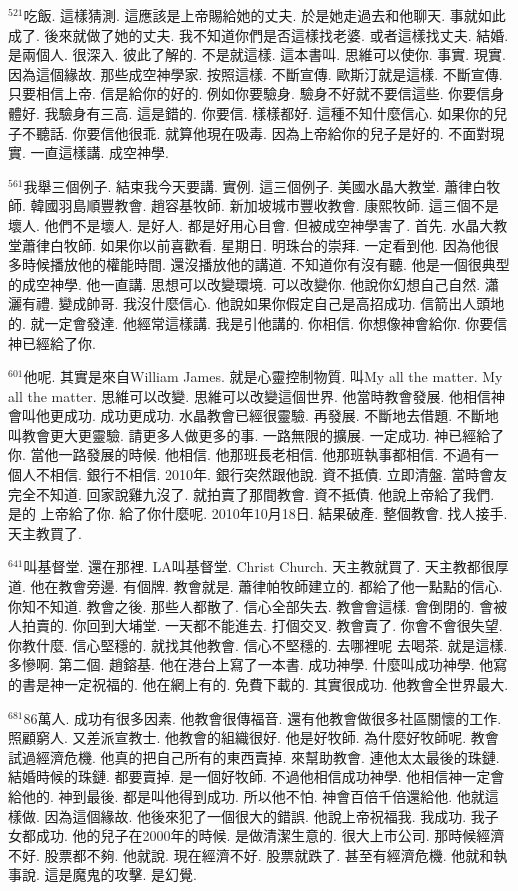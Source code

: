 \documentclass{book}
\begin{document}
$^{521}$吃飯.
這樣猜測.
這應該是上帝賜給她的丈夫.
於是她走過去和他聊天.
事就如此成了.
後來就做了她的丈夫.
我不知道你們是否這樣找老婆.
或者這樣找丈夫.
結婚.
是兩個人.
很深入.
彼此了解的.
不是就這樣.
這本書叫.
思維可以使你.
事實.
現實.
因為這個緣故.
那些成空神學家.
按照這樣.
不斷宣傳.
歐斯汀就是這樣.
不斷宣傳.
只要相信上帝.
信是給你的好的.
例如你要驗身.
驗身不好就不要信這些.
你要信身體好.
我驗身有三高.
這是錯的.
你要信.
樣樣都好.
這種不知什麼信心.
如果你的兒子不聽話.
你要信他很乖.
就算他現在吸毒.
因為上帝給你的兒子是好的.
不面對現實.
一直這樣講.
成空神學.

$^{561}$我舉三個例子.
結束我今天要講.
實例.
這三個例子.
美國水晶大教堂.
蕭律白牧師.
韓國羽島順豐教會.
趙容基牧師.
新加坡城市豐收教會.
康熙牧師.
這三個不是壞人.
他們不是壞人.
是好人.
都是好用心目會.
但被成空神學害了.
首先.
水晶大教堂蕭律白牧師.
如果你以前喜歡看.
星期日.
明珠台的崇拜.
一定看到他.
因為他很多時候播放他的權能時間.
還沒播放他的講道.
不知道你有沒有聽.
他是一個很典型的成空神學.
他一直講.
思想可以改變環境.
可以改變你.
他說你幻想自己自然.
瀟灑有禮.
變成帥哥.
我沒什麼信心.
他說如果你假定自己是高招成功.
信箭出人頭地的.
就一定會發達.
他經常這樣講.
我是引他講的.
你相信.
你想像神會給你.
你要信神已經給了你.

$^{601}$他呢.
其實是來自William James.
就是心靈控制物質.
叫My all the matter.
My all the matter.
思維可以改變.
思維可以改變這個世界.
他當時教會發展.
他相信神會叫他更成功.
成功更成功.
水晶教會已經很靈驗.
再發展.
不斷地去借題.
不斷地叫教會更大更靈驗.
請更多人做更多的事.
一路無限的擴展.
一定成功.
神已經給了你.
當他一路發展的時候.
他相信.
他那班長老相信.
他那班執事都相信.
不過有一個人不相信.
銀行不相信.
2010年.
銀行突然跟他說.
資不抵債.
立即清盤.
當時會友完全不知道.
回家說雞九沒了.
就拍賣了那間教會.
資不抵債.
他說上帝給了我們.
是的 上帝給了你.
給了你什麼呢.
2010年10月18日.
結果破產.
整個教會.
找人接手.
天主教買了.

$^{641}$叫基督堂.
還在那裡.
LA叫基督堂.
Christ Church.
天主教就買了.
天主教都很厚道.
他在教會旁邊.
有個牌.
教會就是.
蕭律帕牧師建立的.
都給了他一點點的信心.
你知不知道.
教會之後.
那些人都散了.
信心全部失去.
教會會這樣.
會倒閉的.
會被人拍賣的.
你回到大埔堂.
一天都不能進去.
打個交叉.
教會賣了.
你會不會很失望.
你教什麼.
信心堅穩的.
就找其他教會.
信心不堅穩的.
去哪裡呢 去喝茶.
就是這樣.
多慘啊.
第二個.
趙鎔基.
他在港台上寫了一本書.
成功神學.
什麼叫成功神學.
他寫的書是神一定祝福的.
他在網上有的.
免費下載的.
其實很成功.
他教會全世界最大.

$^{681}$86萬人.
成功有很多因素.
他教會很傳福音.
還有他教會做很多社區關懷的工作.
照顧窮人.
又差派宣教士.
他教會的組織很好.
他是好牧師.
為什麼好牧師呢.
教會試過經濟危機.
他真的把自己所有的東西賣掉.
來幫助教會.
連他太太最後的珠鏈.
結婚時候的珠鏈.
都要賣掉.
是一個好牧師.
不過他相信成功神學.
他相信神一定會給他的.
神到最後.
都是叫他得到成功.
所以他不怕.
神會百倍千倍還給他.
他就這樣做.
因為這個緣故.
他後來犯了一個很大的錯誤.
他說上帝祝福我.
我成功.
我子女都成功.
他的兒子在2000年的時候.
是做清潔生意的.
很大上市公司.
那時候經濟不好.
股票都不夠.
他就說.
現在經濟不好.
股票就跌了.
甚至有經濟危機.
他就和執事說.
這是魔鬼的攻擊.
是幻覺.
\end{document}

